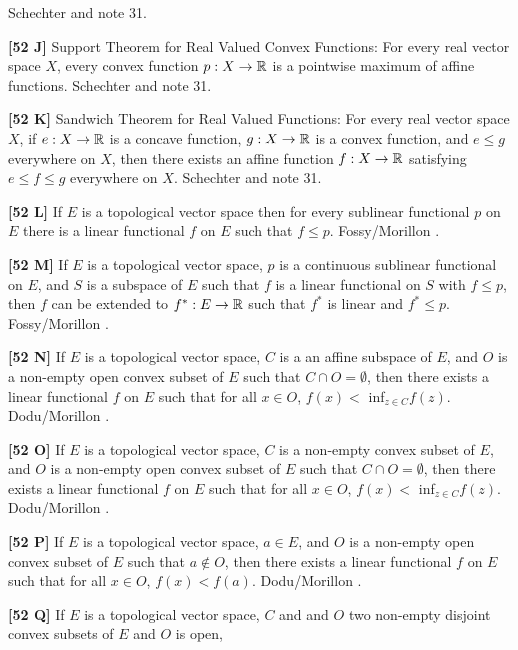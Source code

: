 \ac{Schechter} \cite{1996b} and note 31.
\smallskip
\item{}{\bf [52 J]}  Support Theorem for Real Valued Convex Functions:
For every real vector space $X$,
every convex function $p: X\to {\Bbb R}$ is a pointwise maximum of
affine functions.  \ac{Schechter} \cite{1996b} and note 31.
\smallskip
\item{}{\bf [52 K]} Sandwich Theorem for Real Valued Functions:
For every real vector space $X$, if
$e: X\to {\Bbb R}$ is a concave function, $g: X\to {\Bbb R}$ is a convex
function, and $e\le g$ everywhere on $X$, then there exists an affine
function $f: X \to {\Bbb R}$ satisfying $e \le f \le g$ everywhere on
$X$.  \ac{Schechter} \cite{1996b} and note 31.
\smallskip
\item{}{\bf [52 L]} If $E$ is a topological vector space then for every
sublinear functional $p$ on $E$ there is a linear functional $f$ on $E$
such that $f\le p$. \ac{Fossy/Morillon} \cite{1998}.
\smallskip
\item{}{\bf [52 M]}  If $E$ is a topological vector space, $p$
is a continuous sublinear functional on $E$, and  $S$ is a subspace of
$E$ such that $f$ is a linear functional on $S$ with $f\le p$, then
$f$ can be extended to $f^{*} : E \rightarrow {\Bbb R}$ such that
$f^{*}$ is linear and $f^*\le p$. \ac{Fossy/Morillon} \cite{1998}.
\smallskip
\item{}{\bf [52 N]} If $E$ is a topological vector space, $C$ is a
an affine subspace of $E$, and $O$ is a non-empty open convex
subset of $E$ such that $C\cap O=\emptyset$, then there exists a
linear functional $f$ on $E$ such that for all $x\in O$, $f(x) <$
inf$_{z\in C}f(z)$. \ac{Dodu/Morillon} \cite{1999}.
\smallskip
\item{}{\bf [52 O]} If $E$ is a topological vector space, $C$ is a
non-empty convex subset of $E$, and $O$ is a non-empty open convex
subset of $E$ such that $C\cap O=\emptyset$, then there exists a
linear functional $f$ on $E$ such that for all $x\in O$, $f(x) <$
inf$_{z\in C}f(z)$. \ac{Dodu/Morillon} \cite{1999}.
\smallskip
\item{}{\bf [52 P]} If $E$ is a topological vector space, $a\in E$,
and $O$ is a non-empty open convex subset of $E$ such that $a\notin O$,
then there exists a linear functional $f$ on $E$ such that for all
$x\in O$, $f(x) < f(a)$. \ac{Dodu/Morillon} \cite{1999}.
\smallskip
\item{}{\bf [52 Q]} If $E$ is a topological vector space, $C$ and
and $O$ two non-empty disjoint convex subsets of $E$ and $O$ is open,
